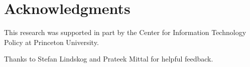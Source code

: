 \section*{Acknowledgments}
This research was supported in part by the Center for Information Technology
Policy at Princeton University.

Thanks to Stefan Lindskog and Prateek Mittal for helpful feedback.
